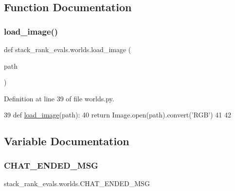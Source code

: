 \subsection{Function Documentation}
\mbox{\label{namespacestack__rank__evals_1_1worlds_a0174c3e372a345f192cef824e4c5528d}} 
\subsubsection{\texorpdfstring{load\+\_\+image()}{load\_image()}}
{\footnotesize\ttfamily def stack\+\_\+rank\+\_\+evals.\+worlds.\+load\+\_\+image (\begin{DoxyParamCaption}\item[{}]{path }\end{DoxyParamCaption})}



Definition at line 39 of file worlds.\+py.


\begin{DoxyCode}
39 \textcolor{keyword}{def }\hyperlink{namespacepersonality__captions_1_1worlds_a2863737d97a8e8c5a1ebe9029d0d2293}{load\_image}(path):
40     \textcolor{keywordflow}{return} Image.open(path).convert(\textcolor{stringliteral}{'RGB'})
41 
42 
\end{DoxyCode}


\subsection{Variable Documentation}
\mbox{\label{namespacestack__rank__evals_1_1worlds_a71080d86e00a5024b9b9b0d61eb778de}} 
\subsubsection{\texorpdfstring{C\+H\+A\+T\+\_\+\+E\+N\+D\+E\+D\+\_\+\+M\+SG}{CHAT\_ENDED\_MSG}}
{\footnotesize\ttfamily stack\+\_\+rank\+\_\+evals.\+worlds.\+C\+H\+A\+T\+\_\+\+E\+N\+D\+E\+D\+\_\+\+M\+SG}



